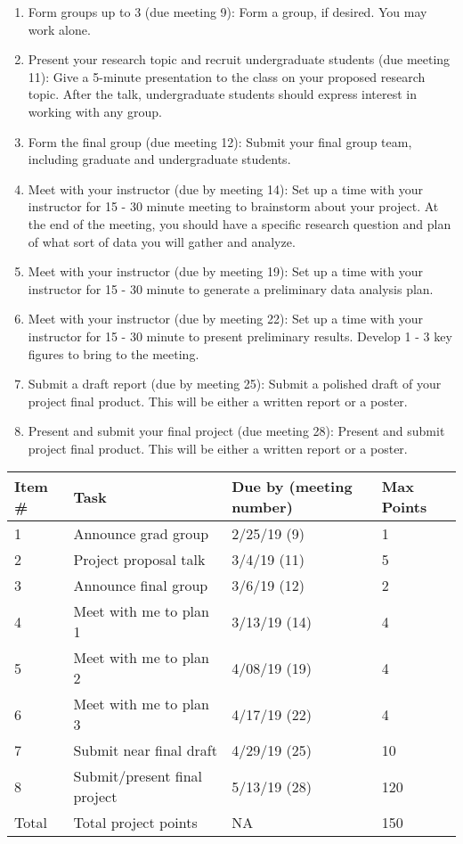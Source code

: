 \documentclass[11pt,onecolumn]{article}
\begin{document}
\begin{enumerate}
  \itemsep0em
\item Form groups up to 3 (due meeting 9): Form a group, if desired. You may work alone.
\item Present your research topic and recruit undergraduate students (due meeting 11): Give a 5-minute presentation to the class on your proposed research topic. After the talk, undergraduate students should express interest in working with any group.
\item Form the final group (due meeting 12): Submit your final group team, including graduate and undergraduate students.
\item Meet with your instructor (due by meeting 14): Set up a time with your instructor for 15 - 30 minute meeting to brainstorm about your project. At the end of the meeting, you should have a specific research question and plan of what sort of data you will gather and analyze.
\item Meet with your instructor (due by meeting 19): Set up a time with your instructor for 15 - 30 minute to generate a preliminary data analysis plan.
\item Meet with your instructor (due by meeting 22): Set up a time with your instructor for 15 - 30 minute to present preliminary results. Develop 1 - 3 key figures to bring to the meeting.
\item Submit a draft report (due by meeting 25): Submit a polished draft of your project final product. This will be either a written report or a poster.
\item Present and submit your final project (due meeting 28): Present and submit project final product. This will be either a written report or a poster.
  
\end{enumerate}

\begin{table}
  \centering
  \begin{tabular}{l|lll}
    Item \# & Task & Due by (meeting number) & Max Points \\
    \hline
    1 & Announce grad group & 2/25/19 (9) & 1 \\
    2 & Project proposal talk & 3/4/19 (11) & 5 \\
    3 & Announce final group & 3/6/19 (12) & 2 \\
    4 & Meet with me to plan 1 & 3/13/19 (14) & 4 \\
    5 & Meet with me to plan 2 & 4/08/19 (19) & 4 \\
    6 & Meet with me to plan 3 & 4/17/19 (22) & 4 \\
    7 & Submit near final draft & 4/29/19 (25) & 10 \\
    8 & Submit/present final project & 5/13/19 (28) & 120 \\
    \hline
    Total & Total project points & NA & 150 \\
  \end{tabular}
\end{table}
\end{document}
